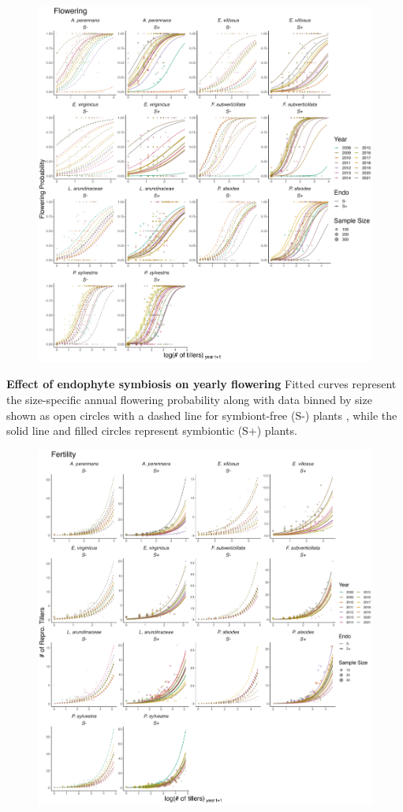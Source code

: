 \documentclass[12pt]{article}
\begin{document}
\begin{figure}[H]
	\centering
	\includegraphics[width=\linewidth]{flw_yearplot.png}
\end{figure}
 \textbf{Effect of endophyte symbiosis on yearly flowering} Fitted curves represent the size-specific annual flowering probability along with data binned by size shown as open circles with a dashed line for symbiont-free (S-) plants , while the solid line and filled circles represent symbiontic (S+) plants.
\begin{figure}[H]
	\centering
	\includegraphics[width=\linewidth]{fert_yearplot.png}
\end{figure}
\end{document}
